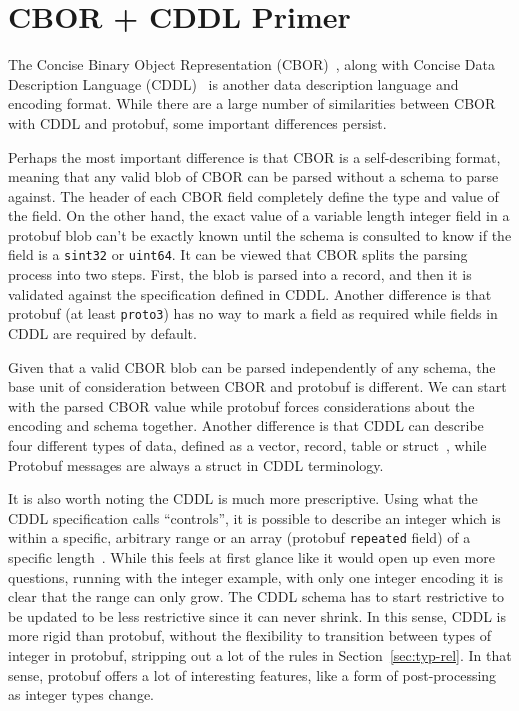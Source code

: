 \section{CBOR + CDDL Primer}

The Concise Binary Object Representation
(CBOR)~\cite{bormannConciseBinaryObject2020}, along with Concise Data
Description Language (CDDL)~\cite{birkholzConciseDataDefinition2019} is another
data description language and encoding format. While there are a large number of
similarities between CBOR with CDDL and protobuf, some important differences
persist.

Perhaps the most important difference is that CBOR is a self-describing format,
meaning that any valid blob of CBOR can be parsed without a schema to parse
against. The header of each CBOR field completely define the type and value of the
field. On the other hand, the exact value of a variable length integer field in
a protobuf blob can't be exactly known until the schema is consulted to know if
the field is a \texttt{sint32} or \texttt{uint64}. It can be viewed that CBOR
splits the parsing process into two steps. First, the blob is parsed into a
record, and then it is validated against the specification defined in
CDDL. Another difference is that protobuf (at least \texttt{proto3}) has no way
to mark a field as required while fields in CDDL are required by default.

Given that a valid CBOR blob can be parsed independently of any schema, the base
unit of consideration between CBOR and protobuf is different. We can start with
the parsed CBOR value while protobuf forces considerations about the encoding
and schema together. Another difference is that CDDL can describe four different
types of data, defined as a vector, record, table or
struct~\cite{birkholzConciseDataDefinition2019}, while Protobuf messages are
always a struct in CDDL terminology.

It is also worth noting the CDDL is much more prescriptive. Using what the CDDL
specification calls ``controls'', it is possible to describe an integer which is
within a specific, arbitrary range or an array (protobuf \texttt{repeated}
field) of a specific length~\cite{birkholzConciseDataDefinition2019}. While this
feels at first glance like it would open up even more questions, running with
the integer example, with only one integer encoding it is clear that the range
can only grow. The CDDL schema has to start restrictive to be updated to be less
restrictive since it can never shrink. In this sense, CDDL is more rigid than
protobuf, without the flexibility to transition between types of integer in
protobuf, stripping out a lot of the rules in Section~\ref{sec:typ-rel}. In that
sense, protobuf offers a lot of interesting features, like a form of
post-processing as integer types change.


